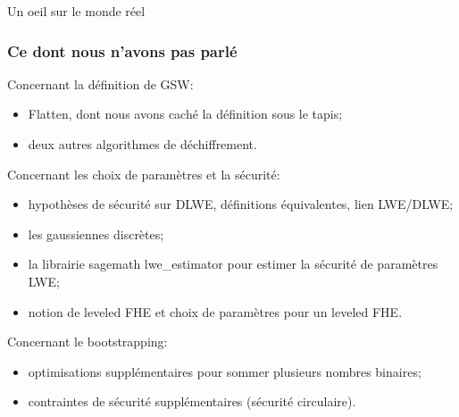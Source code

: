\documentclass[10pt,xcolor={usenames,dvipsnames}]{beamer}
\begin{document}
\begin{section}{Un oeil sur le monde réel}
\begin{frame}
\end{frame} 


\begin{frame}
\frametitle{Ce dont nous n'avons pas parlé}
Concernant la définition de GSW:
\begin{itemize}
\item Flatten, dont nous avons caché la définition sous le tapis;
\item deux autres algorithmes de déchiffrement.
\end{itemize}
Concernant les choix de paramètres et la sécurité:

\begin{itemize}
\item hypothèses de sécurité sur DLWE, définitions équivalentes, lien LWE/DLWE;
\item les gaussiennes discrètes;
\item la librairie sagemath lwe\_estimator pour estimer la sécurité de paramètres LWE;
\item notion de leveled FHE et choix de paramètres pour un leveled FHE.
\end{itemize}

Concernant le bootstrapping:
\begin{itemize}
\item optimisations supplémentaires pour sommer plusieurs nombres binaires;
\item contraintes de sécurité supplémentaires (sécurité circulaire).
\end{itemize}
\end{frame}

\end{section}


\end{document}
